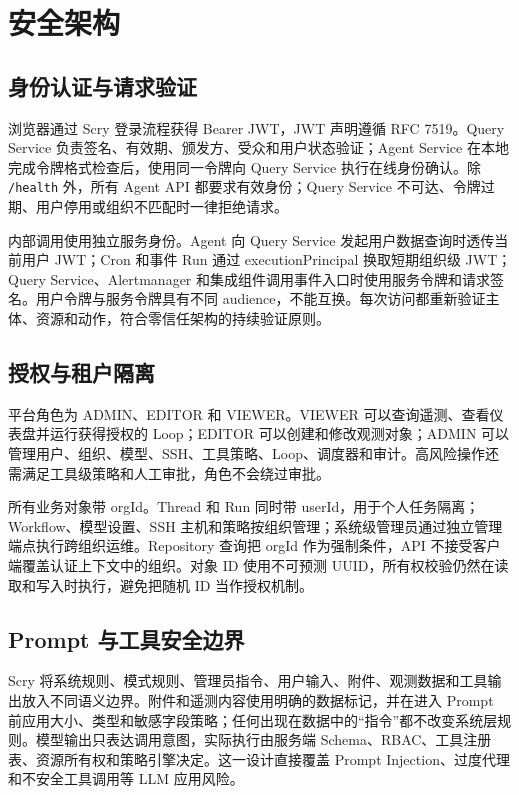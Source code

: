 \documentclass[conference,10pt]{IEEEtran}
\newcommand{\code}[1]{\texttt{#1}}
\begin{document}
\section{安全架构}

\subsection{身份认证与请求验证}

浏览器通过 Scry 登录流程获得 Bearer JWT，JWT 声明遵循 RFC 7519\cite{rfc7519}。Query Service 负责签名、有效期、颁发方、受众和用户状态验证；Agent Service 在本地完成令牌格式检查后，使用同一令牌向 Query Service 执行在线身份确认。除 \code{/health} 外，所有 Agent API 都要求有效身份；Query Service 不可达、令牌过期、用户停用或组织不匹配时一律拒绝请求。

内部调用使用独立服务身份。Agent 向 Query Service 发起用户数据查询时透传当前用户 JWT；Cron 和事件 Run 通过 executionPrincipal 换取短期组织级 JWT；Query Service、Alertmanager 和集成组件调用事件入口时使用服务令牌和请求签名。用户令牌与服务令牌具有不同 audience，不能互换。每次访问都重新验证主体、资源和动作，符合零信任架构的持续验证原则\cite{nistzt}。

\subsection{授权与租户隔离}

平台角色为 ADMIN、EDITOR 和 VIEWER。VIEWER 可以查询遥测、查看仪表盘并运行获得授权的 Loop；EDITOR 可以创建和修改观测对象；ADMIN 可以管理用户、组织、模型、SSH、工具策略、Loop、调度器和审计。高风险操作还需满足工具级策略和人工审批，角色不会绕过审批。

所有业务对象带 orgId。Thread 和 Run 同时带 userId，用于个人任务隔离；Workflow、模型设置、SSH 主机和策略按组织管理；系统级管理员通过独立管理端点执行跨组织运维。Repository 查询把 orgId 作为强制条件，API 不接受客户端覆盖认证上下文中的组织。对象 ID 使用不可预测 UUID，所有权校验仍然在读取和写入时执行，避免把随机 ID 当作授权机制。

\subsection{Prompt 与工具安全边界}

Scry 将系统规则、模式规则、管理员指令、用户输入、附件、观测数据和工具输出放入不同语义边界。附件和遥测内容使用明确的数据标记，并在进入 Prompt 前应用大小、类型和敏感字段策略；任何出现在数据中的“指令”都不改变系统层规则。模型输出只表达调用意图，实际执行由服务端 Schema、RBAC、工具注册表、资源所有权和策略引擎决定。这一设计直接覆盖 Prompt Injection、过度代理和不安全工具调用等 LLM 应用风险\cite{owaspllm}。
\end{document}
